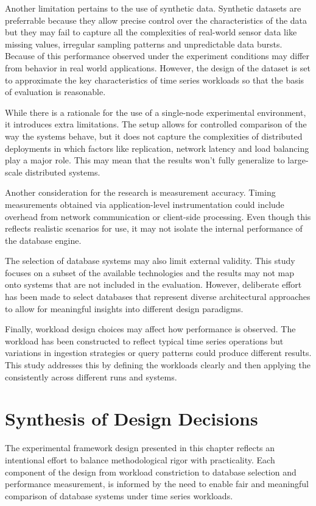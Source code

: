 Another limitation pertains to the use of synthetic data. Synthetic datasets are preferrable because they allow precise control over the characteristics of the data but they may fail to capture all the complexities of real-world sensor data like missing values, irregular sampling patterns and unpredictable data bursts. Because of this performance observed under the experiment conditions may differ from behavior in real world applications. However, the design of the dataset is set to approximate the key characteristics of time series workloads so that the basis of evaluation is reasonable. 


While there is a rationale for the use of a single-node experimental environment, it introduces extra limitations. The setup allows for controlled comparison of the way the systems behave, but it does not capture the complexities of distributed deployments in which factors like replication, network latency and load balancing play a major role. This may mean that the results won’t fully generalize to large-scale distributed systems. 


Another consideration for the research is measurement accuracy. Timing measurements obtained via application-level instrumentation could include overhead from network communication or client-side processing. Even though this reflects realistic scenarios for use, it may not isolate the internal performance of the database engine. 

The selection of database systems may also limit external validity. This study focuses on a subset of the available technologies and the results may not map onto systems that are not included in the evaluation. However, deliberate effort has been made to select databases that represent diverse architectural approaches to allow for meaningful insights into different design paradigms. 

Finally, workload design choices may affect how performance is observed. The workload has been constructed to reflect typical time series operations but variations in ingestion strategies or query patterns could produce different results. This study addresses this by defining the workloads clearly and then applying the consistently across different runs and systems. 







\section{Synthesis of Design Decisions}
The experimental framework design presented in this chapter reflects an intentional effort to balance methodological rigor with practicality. Each component of the design from workload constriction to database selection and performance measurement, is informed by the need to enable fair and meaningful comparison of database systems under time series workloads. 


